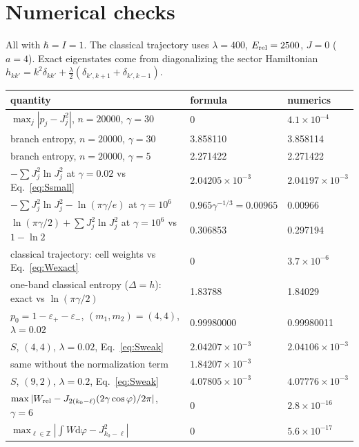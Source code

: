 \documentclass[aps,pra,onecolumn,notitlepage,nofootinbib,11pt]{revtex4-2}
\newcommand{\dd}{\mathrm{d}}
\newcommand{\Erel}{E_{\rm rel}}
\newcommand{\epsp}{\varepsilon_{+}}
\newcommand{\epsm}{\varepsilon_{-}}
\begin{document}
\section{Numerical checks}
\label{sec:num}

All with $\hbar=I=1$. The classical trajectory uses $\lambda=400$, $\Erel=2500$, $J=0$
($a=4$). Exact eigenstates come from diagonalizing the sector Hamiltonian
$h_{kk'}=k^{2}\delta_{kk'}+\frac{\lambda}{2}(\delta_{k',k+1}+\delta_{k',k-1})$.
\begin{center}
\begin{tabular}{lll}
\hline\hline
quantity & formula & numerics\\
\hline
$\max_{j}|p_{j}-J_{j}^{2}|$, $n=20000$, $\gamma=30$ & 0 & $4.1\times10^{-4}$\\
branch entropy, $n=20000$, $\gamma=30$ & 3.858110 & 3.858114\\
branch entropy, $n=20000$, $\gamma=5$ & 2.271422 & 2.271422\\
$-\sum J_{j}^{2}\ln J_{j}^{2}$ at $\gamma=0.02$ vs Eq.~\eqref{eq:Ssmall} & $2.04205\times10^{-3}$ & $2.04197\times10^{-3}$\\
$-\sum J_{j}^{2}\ln J_{j}^{2}-\ln(\pi\gamma/e)$ at $\gamma=10^{6}$ & $0.965\gamma^{-1/3}=0.00965$ & 0.00966\\
$\ln(\pi\gamma/2)+\sum J_{j}^{2}\ln J_{j}^{2}$ at $\gamma=10^{6}$ vs $1-\ln2$ & 0.306853 & 0.297194\\
classical trajectory: cell weights vs Eq.~\eqref{eq:Wexact} & 0 & $3.7\times10^{-6}$\\
one-band classical entropy ($\Delta=h$): exact vs $\ln(\pi\gamma/2)$ & 1.83788 & 1.84029\\
$p_{0}=1-\epsp-\epsm$, $(m_{1},m_{2})=(4,4)$, $\lambda=0.02$ & 0.99980000 & 0.99980011\\
$S$, $(4,4)$, $\lambda=0.02$, Eq.~\eqref{eq:Sweak} & $2.04207\times10^{-3}$ & $2.04106\times10^{-3}$\\
\quad same without the normalization term & $1.84207\times10^{-3}$ & \\
$S$, $(9,2)$, $\lambda=0.2$, Eq.~\eqref{eq:Sweak} & $4.07805\times10^{-3}$ & $4.07776\times10^{-3}$\\
$\max|W_{\rm rel}-J_{2(k_{0}-\ell)}(2\gamma\cos\varphi)/2\pi|$, $\gamma=6$ & 0 & $2.8\times10^{-16}$\\
$\max_{\ell\in\mathbb{Z}}|\int W\dd\varphi-J_{k_{0}-\ell}^{2}|$ & 0 & $5.6\times10^{-17}$\\

\end{tabular}
\end{center}
\end{document}
